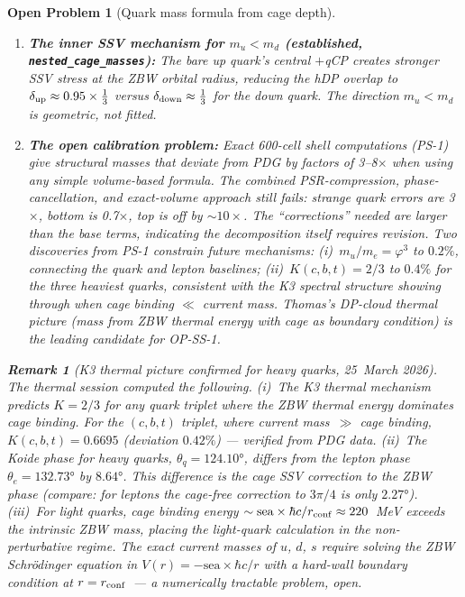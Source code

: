 \documentclass[11pt,a4paper]{article}
\newtheorem{remark}[theorem]{Remark}
\newtheorem{openprob}[theorem]{Open Problem}
\newcommand{\phig}{\varphi}
\begin{document}
\begin{openprob}[Quark mass formula from cage depth]
\begin{enumerate}
\item \textbf{The inner SSV mechanism for $m_u < m_d$
  (established, \texttt{nested\_cage\_masses}):}
  The bare up quark's central $+$qCP creates stronger SSV stress
  at the ZBW orbital radius, reducing the hDP overlap to
  $\delta_{\rm up} \approx 0.95 \times \frac{1}{3}$ versus
  $\delta_{\rm down} \approx \frac{1}{3}$ for the down quark.
  The direction $m_u < m_d$ is geometric, not fitted.

\item \textbf{The open calibration problem:}
  Exact 600-cell shell computations (PS-1) give structural masses
  that deviate from PDG by factors of 3--8$\times$ when using any
  simple volume-based formula.  The combined PSR-compression,
  phase-cancellation, and exact-volume approach still fails:
  strange quark errors are 3$\times$, bottom is 0.7$\times$,
  top is off by $\sim 10\times$.  The ``corrections'' needed
  are larger than the base terms, indicating the decomposition
  itself requires revision.  Two discoveries from PS-1 constrain
  future mechanisms: (i)~$m_u/m_e = \phig^3$ to $0.2\%$,
  connecting the quark and lepton baselines; (ii)~$K(c,b,t)
  = 2/3$ to $0.4\%$ for the three heaviest quarks, consistent
  with the K3 spectral structure showing through when cage
  binding $\ll$ current mass.  Thomas's DP-cloud thermal picture
  (mass from ZBW thermal energy with cage as boundary condition)
  is the leading candidate for OP-SS-1.
\end{enumerate}

\begin{remark}[K3 thermal picture confirmed for heavy quarks, 25~March 2026]
The thermal session computed the following.
(i)~The K3 thermal mechanism predicts $K = 2/3$ for any quark triplet
where the ZBW thermal energy dominates cage binding.
For the $(c,b,t)$ triplet, where current mass~$\gg$ cage binding,
$K(c,b,t) = 0.6695$ (deviation $0.42\%$) --- verified from PDG data.
(ii)~The Koide phase for heavy quarks, $\theta_q = 124.10°$,
differs from the lepton phase $\theta_e = 132.73°$ by $8.64°$.
This difference is the cage SSV correction to the ZBW phase
(compare: for leptons the cage-free correction to $3\pi/4$
is only $2.27°$).
(iii)~For light quarks, cage binding energy
$\sim \text{sea}\times\hbar c/r_{\rm conf} \approx 220$~MeV
exceeds the intrinsic ZBW mass, placing the light-quark calculation
in the non-perturbative regime.
The exact current masses of $u$, $d$, $s$ require solving the
ZBW Schrödinger equation in $V(r) = -\text{sea}\times\hbar c/r$
with a hard-wall boundary condition at $r = r_{\rm conf}$~---
a numerically tractable problem, open.
\end{remark}


\end{openprob}
\end{document}
